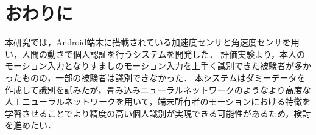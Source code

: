 \section{おわりに}
本研究では，Android端末に搭載されている加速度センサと角速度センサを用い，人間の動きで個人認証を行うシステムを開発した．
評価実験より，本人のモーション入力となりすましのモーション入力を上手く識別できた被験者が多かったものの，一部の被験者は識別できなかった．
本システムはダミーデータを作成して識別を試みたが，畳み込みニューラルネットワークのようなより高度な人工ニューラルネットワークを用いて，端末所有者のモーションにおける特徴を学習させることでより精度の高い個人識別が実現できる可能性があるため，検討を進めたい．
